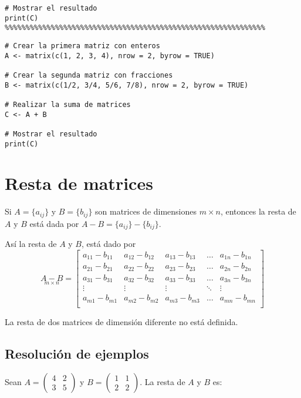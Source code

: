 \begin{}
\begin{verbatim}
# Mostrar el resultado
print(C)
%%%%%%%%%%%%%%%%%%%%%%%%%%%%%%%%%%%%%%%%%%%%%%%%%%%%%%%%%%%%%%    
\end{verbatim}
\begin{verbatim}
# Crear la primera matriz con enteros
A <- matrix(c(1, 2, 3, 4), nrow = 2, byrow = TRUE)

# Crear la segunda matriz con fracciones
B <- matrix(c(1/2, 3/4, 5/6, 7/8), nrow = 2, byrow = TRUE)

# Realizar la suma de matrices
C <- A + B

# Mostrar el resultado
print(C)    
\end{verbatim}
\section{Resta de matrices} 

\begin{definition}
Si $A = \{a_{ij}\}$ y $B = \{b_{ij}\}$ son matrices de dimensiones $m\times n$, entonces la resta de $A$ y $B$ está dada por $A-B=\{a_{ij}\}-\{b_{ij}\}$.
\end{definition}
Así la resta de $A$ y $B$, está dado  por
$$
\underset{m \times n}{A-B}=\begin{bmatrix}
    a_{11}-b_{11} & a_{12}-b_{12} & a_{13}-b_{13} & \dots & a_{1n}-b_{1n} \\
    a_{21}-b_{21} & a_{22}-b_{22} & a_{23}-b_{23} & \dots & a_{2n}-b_{2n} \\
    a_{31}-b_{31} & a_{32}-b_{32} & a_{33}-b_{33} & \dots & a_{3n}-b_{3n} \\
    \vdots & \vdots & \vdots & \ddots & \vdots \\
    a_{m1}-b_{m1} & a_{m2}-b_{m2} & a_{m3}-b_{m3} & \dots & a_{mn}-b_{mn} \\
  \end{bmatrix}
$$



\begin{remark}
La resta de dos matrices de dimensión diferente no está definida.    
\end{remark}
\subsection{Resolución de ejemplos}
\begin{example}
Sean \( A = \begin{pmatrix} 4 & 2 \\ 3 & 5 \end{pmatrix} \) y \( B = \begin{pmatrix} 1 & 1 \\ 2 & 2 \end{pmatrix} \). La resta de \( A \) y \( B \) es:


\end{example}
\end{}
